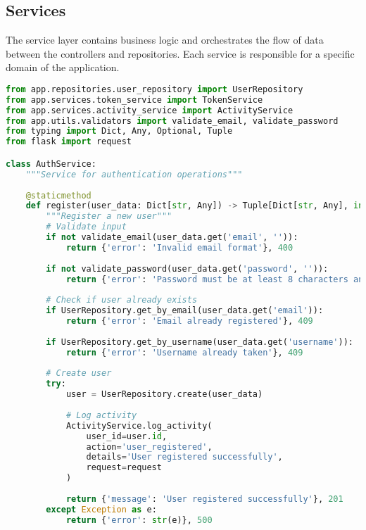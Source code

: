 \documentclass{article}
\begin{document}
\subsection{Services}

The service layer contains business logic and orchestrates the flow of data between the controllers and repositories. Each service is responsible for a specific domain of the application.

\begin{lstlisting}[language=python, caption=Auth Service in app/services/auth\_service.py]
from app.repositories.user_repository import UserRepository
from app.services.token_service import TokenService
from app.services.activity_service import ActivityService
from app.utils.validators import validate_email, validate_password
from typing import Dict, Any, Optional, Tuple
from flask import request

class AuthService:
    """Service for authentication operations"""
    
    @staticmethod
    def register(user_data: Dict[str, Any]) -> Tuple[Dict[str, Any], int]:
        """Register a new user"""
        # Validate input
        if not validate_email(user_data.get('email', '')):
            return {'error': 'Invalid email format'}, 400
        
        if not validate_password(user_data.get('password', '')):
            return {'error': 'Password must be at least 8 characters and contain letters and numbers'}, 400
        
        # Check if user already exists
        if UserRepository.get_by_email(user_data.get('email')):
            return {'error': 'Email already registered'}, 409
        
        if UserRepository.get_by_username(user_data.get('username')):
            return {'error': 'Username already taken'}, 409
        
        # Create user
        try:
            user = UserRepository.create(user_data)
            
            # Log activity
            ActivityService.log_activity(
                user_id=user.id,
                action='user_registered',
                details='User registered successfully',
                request=request
            )
            
            return {'message': 'User registered successfully'}, 201
        except Exception as e:
            return {'error': str(e)}, 500
    

\end{lstlisting}
\end{document}
